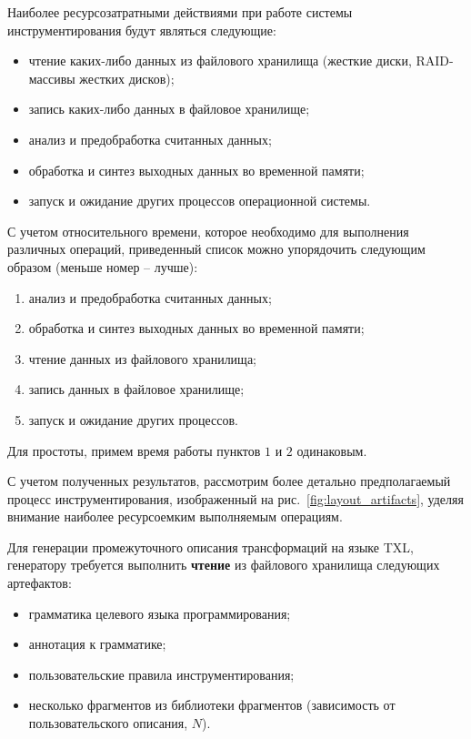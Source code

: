 Наиболее ресурсозатратными действиями при работе системы инструментирования будут являться следующие:
\begin{itemize}[noitemsep]
  \item чтение каких-либо данных из файлового хранилища (жесткие диски, RAID-массивы жестких дисков);
  \item запись каких-либо данных в файловое хранилище;
  \item анализ и предобработка считанных данных;
  \item обработка и синтез выходных данных во временной памяти;
  \item запуск и ожидание других процессов операционной системы.
\end{itemize}

С учетом относительного времени, которое необходимо для выполнения различных операций, приведенный список можно упорядочить следующим образом (меньше номер -- лучше):
\begin{enumerate}[noitemsep]
  \item анализ и предобработка считанных данных;
  \item обработка и синтез выходных данных во временной памяти;
  \item чтение данных из файлового хранилища;
  \item запись данных в файловое хранилище;
  \item запуск и ожидание других процессов.
\end{enumerate}

Для простоты, примем время работы пунктов $1$ и $2$ одинаковым.

С учетом полученных результатов, рассмотрим более детально предполагаемый процесс инструментирования, изображенный на рис.~\ref{fig:layout_artifacts}, уделяя внимание наиболее ресурсоемким выполняемым операциям.

Для генерации промежуточного описания трансформаций на языке TXL, генератору требуется выполнить \textbf{чтение} из файлового хранилища следующих артефактов:
\begin{itemize}[noitemsep]
  \item грамматика целевого языка программирования;
  \item аннотация к грамматике;
  \item пользовательские правила инструментирования;
  \item несколько фрагментов из библиотеки фрагментов (зависимость от пользовательского описания, $N$).
\end{itemize}

